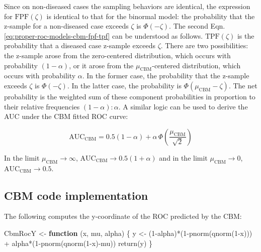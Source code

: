 \documentclass[
]{book}
\newenvironment{Shaded}{\begin{snugshade}}{\end{snugshade}}
\newcommand{\ControlFlowTok}[1]{\textcolor[rgb]{0.13,0.29,0.53}{\textbf{#1}}}
\newcommand{\DecValTok}[1]{\textcolor[rgb]{0.00,0.00,0.81}{#1}}
\newcommand{\FunctionTok}[1]{\textcolor[rgb]{0.00,0.00,0.00}{#1}}
\newcommand{\NormalTok}[1]{#1}
\newcommand{\OtherTok}[1]{\textcolor[rgb]{0.56,0.35,0.01}{#1}}
\newcommand{\SpecialCharTok}[1]{\textcolor[rgb]{0.00,0.00,0.00}{#1}}
\begin{document}
Since on non-diseased cases the sampling behaviors are identical, the expression for \(\text{FPF}\left( \zeta \right)\) is identical to that for the binormal model: the probability that the z-sample for a non-diseased case exceeds \(\zeta\) is \(\Phi\left( -\zeta \right)\). The second Eqn. \eqref{eq:proper-roc-models-cbm-fpf-tpf} can be understood as follows. \(\text{TPF}\left( \zeta \right)\) is the probability that a diseased case z-sample exceeds \(\zeta\). There are two possibilities: the z-sample arose from the zero-centered distribution, which occurs with probability \(\left( 1-\alpha \right)\), or it arose from the \(\mu_\text{CBM}\)-centered distribution, which occurs with probability \(\alpha\). In the former case, the probability that the z-sample exceeds \(\zeta\) is \(\Phi\left( -\zeta \right)\). In the latter case, the probability is \(\Phi\left( \mu_\text{CBM}-\zeta \right)\). The net probability is the weighted sum of these component probabilities in proportion to their relative frequencies \(\left( 1-\alpha \right):\alpha\). A similar logic can be used to derive the AUC under the CBM fitted ROC curve:

\begin{equation}
\text{AUC}_\text{CBM}=0.5\left( 1-\alpha \right)+\alpha \,\Phi\left( \frac {\mu_\text{CBM}}{\sqrt{2}} \right)
\label{eq:proper-roc-models-cbm-auc}
\end{equation}

In the limit \(\mu_\text{CBM} \rightarrow \infty\), \(\text{AUC}_\text{CBM} \rightarrow 0.5\left( 1+\alpha \right)\) and in the limit \(\mu_\text{CBM} \rightarrow 0\), \(\text{AUC}_\text{CBM} \rightarrow 0.5\).

\hypertarget{proper-roc-models-cbm-code}{%
\subsection{CBM code implementation}\label{proper-roc-models-cbm-code}}

The following computes the y-coordinate of the ROC predicted by the CBM:

\begin{Shaded}
\begin{Highlighting}[]
\NormalTok{CbmRocY }\OtherTok{\textless{}{-}} \ControlFlowTok{function}\NormalTok{ (x, mu, alpha) \{}
\NormalTok{  y }\OtherTok{\textless{}{-}}\NormalTok{ (}\DecValTok{1}\SpecialCharTok{{-}}\NormalTok{alpha)}\SpecialCharTok{*}\NormalTok{(}\DecValTok{1}\SpecialCharTok{{-}}\FunctionTok{pnorm}\NormalTok{(}\FunctionTok{qnorm}\NormalTok{(}\DecValTok{1}\SpecialCharTok{{-}}\NormalTok{x))) }\SpecialCharTok{+} 
\NormalTok{    alpha}\SpecialCharTok{*}\NormalTok{(}\DecValTok{1}\SpecialCharTok{{-}}\FunctionTok{pnorm}\NormalTok{(}\FunctionTok{qnorm}\NormalTok{(}\DecValTok{1}\SpecialCharTok{{-}}\NormalTok{x)}\SpecialCharTok{{-}}\NormalTok{mu))}
  \FunctionTok{return}\NormalTok{(y)}
\NormalTok{\}}
\end{Highlighting}
\end{Shaded}
\end{document}
